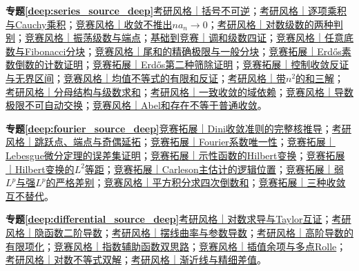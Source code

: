 \par\noindent\textbf{专题\ref{deep:series_source_deep}}\quad \hyperref[deep:ex:series_source_deep:block]{考研风格｜括号不可逆}；\hyperref[deep:ex:series_source_deep:product]{考研风格｜逐项乘积与Cauchy乘积}；\hyperref[deep:ex:series_source_deep:sparse]{竞赛风格｜收敛不推出$na_n\to0$}；\hyperref[deep:ex:series_source_deep:logseries]{考研风格｜对数级数的两种判别}；\hyperref[deep:ex:series_source_deep:oscillation]{竞赛风格｜振荡级数与端点}；\hyperref[deep:ex:series_source_deep:harmonic4]{基础到竞赛｜调和级数四证}；\hyperref[deep:ex:series_source_deep:harmonicblocks]{竞赛风格｜任意底数与Fibonacci分块}；\hyperref[deep:ex:series_source_deep:harmonictail]{竞赛风格｜尾和的精确极限与一般分块}；\hyperref[deep:ex:series_source_deep:prime]{竞赛拓展｜Erdős素数倒数的计数证明}；\hyperref[deep:ex:series_source_deep:primesecond]{竞赛拓展｜Erdős第二种筛除证明}；\hyperref[deep:ex:series_source_deep:dominated]{竞赛拓展｜控制收敛反证与无界区间}；\hyperref[deep:ex:series_source_deep:means]{竞赛风格｜均值不等式的有限和反证}；\hyperref[deep:ex:series_source_deep:nsquare]{考研风格｜带$n^2$的和三解}；\hyperref[deep:ex:series_source_deep:jdenominator]{考研风格｜分母结构与级数求和}；\hyperref[deep:ex:series_source_deep:uniform1]{考研风格｜一致收敛的域依赖}；\hyperref[deep:ex:series_source_deep:derivative]{竞赛风格｜导数极限不可自动交换}；\hyperref[deep:ex:series_source_deep:endpointtrap]{竞赛风格｜Abel和存在不等于普通收敛}。\par
\par\noindent\textbf{专题\ref{deep:fourier_source_deep}}\quad \hyperref[deep:ex:fourier_source_deep:dini]{竞赛拓展｜Dini收敛准则的完整核推导}；\hyperref[deep:ex:fourier_source_deep:jump]{考研风格｜跳跃点、端点与奇偶延拓}；\hyperref[deep:ex:fourier_source_deep:uniqueness]{竞赛拓展｜Fourier系数唯一性}；\hyperref[deep:ex:fourier_source_deep:differentiation]{竞赛拓展｜Lebesgue微分定理的误差集证明}；\hyperref[deep:ex:fourier_source_deep:hilbertindicator]{竞赛拓展｜示性函数的Hilbert变换}；\hyperref[deep:ex:fourier_source_deep:l2hilbert]{竞赛拓展｜Hilbert变换的$L^2$等距}；\hyperref[deep:ex:fourier_source_deep:carlesongap]{竞赛拓展｜Carleson主估计的逻辑位置}；\hyperref[deep:ex:fourier_source_deep:weaklp]{竞赛拓展｜弱$L^p$与强$L^p$的严格差别}；\hyperref[deep:ex:fourier_source_deep:baselparseval]{竞赛风格｜平方积分求四次倒数和}；\hyperref[deep:ex:fourier_source_deep:threelimits]{竞赛拓展｜三种收敛互不替代}。\par
\par\noindent\textbf{专题\ref{deep:differential_source_deep}}\quad \hyperref[deep:ex:differential_source_deep:logdiff]{考研风格｜对数求导与Taylor互证}；\hyperref[deep:ex:differential_source_deep:implicit2]{考研风格｜隐函数二阶导数}；\hyperref[deep:ex:differential_source_deep:parametric]{考研风格｜摆线曲率与参数导数}；\hyperref[deep:ex:differential_source_deep:leibniz]{考研风格｜高阶导数的有限项化}；\hyperref[deep:ex:differential_source_deep:auxiliary]{竞赛风格｜指数辅助函数双思路}；\hyperref[deep:ex:differential_source_deep:interpolation]{竞赛风格｜插值余项与多点Rolle}；\hyperref[deep:ex:differential_source_deep:logbound]{考研风格｜对数不等式双解}；\hyperref[deep:ex:differential_source_deep:asymptote]{考研风格｜渐近线与精细差值}。\par

